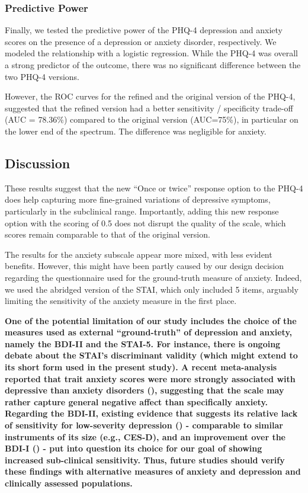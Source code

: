 \documentclass[
  jou,
  longtable,
  nolmodern,
  notxfonts,
  notimes,
  mask,
  colorlinks=true,linkcolor=blue,citecolor=blue,urlcolor=blue]{apa7}
\begin{document}
\subsubsection{Predictive Power}\label{predictive-power}

Finally, we tested the predictive power of the PHQ-4 depression and
anxiety scores on the presence of a depression or anxiety disorder,
respectively. We modeled the relationship with a logistic regression.
While the PHQ-4 was overall a strong predictor of the outcome, there was
no significant difference between the two PHQ-4 versions.

However, the ROC curves for the refined and the original version of the
PHQ-4, suggested that the refined version had a better sensitivity /
specificity trade-off (AUC = 78.36\%) compared to the original version
(AUC=75\%), in particular on the lower end of the spectrum. The
difference was negligible for anxiety.

\subsection{Discussion}\label{discussion-1}

These results suggest that the new ``Once or twice'' response option to
the PHQ-4 does help capturing more fine-grained variations of depressive
symptoms, particularly in the subclinical range. Importantly, adding
this new response option with the scoring of 0.5 does not disrupt the
quality of the scale, which scores remain comparable to that of the
original version.

The results for the anxiety subscale appear more mixed, with less
evident benefits. However, this might have been partly caused by our
design decision regarding the questionnaire used for the ground-truth
measure of anxiety. Indeed, we used the abridged version of the STAI,
which only included 5 items, arguably limiting the sensitivity of the
anxiety measure in the first place.

\textbf{One of the potential limitation of our study includes the choice
of the measures used as external ``ground-truth'' of depression and
anxiety, namely the BDI-II and the STAI-5. For instance, there is
ongoing debate about the STAI's discriminant validity (which might
extend to its short form used in the present study). A recent
meta-analysis reported that trait anxiety scores were more strongly
associated with depressive than anxiety disorders
(),
suggesting that the scale may rather capture general negative affect
than specifically anxiety. Regarding the BDI-II, existing evidence that
suggests its relative lack of sensitivity for low-severity depression
() - comparable to
similar instruments of its size (e.g., CES-D), and an improvement over
the BDI-I () -
put into question its choice for our goal of showing increased
sub-clinical sensitivity. Thus, future studies should verify these
findings with alternative measures of anxiety and depression and
clinically assessed populations.}
\end{document}
